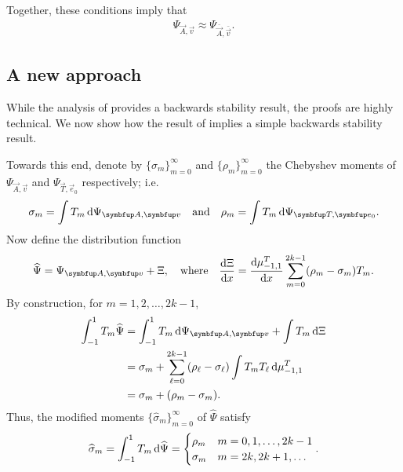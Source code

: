 Together, these conditions imply that
\begin{align}
    \label{eqn:finprec_wCESM}
    \Psi_{\vec{A},\vec{v}}
    \approx \Psi_{\bar{\vec{A}},\bar{\vec{v}}}.
\end{align}


\subsection{A new approach}

While the analysis of \cite{greenbaum_89} provides a backwards stability result, the proofs are highly technical.
We now show how the result of \cite{knizhnerman_96} implies a simple backwards stability result.

Towards this end, denote by $\{\sigma_m\}_{m=0}^{\infty}$ and $\{\rho_m\}_{m=0}^{\infty}$ the Chebyshev moments of $\Psi_{\vec{A},\vec{v}}$ and $\Psi_{\vec{T},\vec{e}_0}$ respectively; i.e. 
\begin{equation*}
    \sigma_m = \int T_m \,\d\Psi_{\vec{A},\vec{v}}
    \quad\text{and}\quad
    \rho_m = \int T_m \,\d\Psi_{\vec{T},\vec{e}_0}.
\end{equation*}
Now define the distribution function
\begin{equation*}
    \widehat{\Psi}
    = \Psi_{\vec{A},\vec{v}} + \Xi
    ,\quad \text{where} \quad
    \frac{\d\Xi}{\d{x}} = \frac{\d\mu_{-1,1}^T}{\d{x}} \sum_{m=0}^{2k-1} (\rho_m - \sigma_m) T_m.
\end{equation*}
By construction, for $m=1,2,\ldots, 2k-1$,
\begin{align*}
    \int_{-1}^{1} T_m \widehat{\Psi}
    &= \int_{-1}^{1} T_m \,\d\Psi_{\vec{A},\vec{v}} + \int T_m \, \d\Xi
    \\&= \sigma_m + \sum_{\ell=0}^{2k-1}(\rho_\ell-\sigma_\ell) \int T_m T_\ell \,\d \mu_{-1,1}^T
    \\&= \sigma_m + (\rho_m - \sigma_m).
\end{align*}
Thus, the modified moments $\{\widehat{\sigma}_m\}_{m=0}^{\infty}$ of $\widehat{\Psi}$ satisfy
\begin{equation*}
    \widehat{\sigma}_m 
    = \int_{-1}^{1} T_m \,\textup{d}\widehat{\Psi}
    = 
    \begin{cases}
    \rho_m & m = 0,1,\ldots, 2k-1 \\
    \sigma_m & m = 2k, 2k+1, \ldots
    \end{cases}.
\end{equation*}


